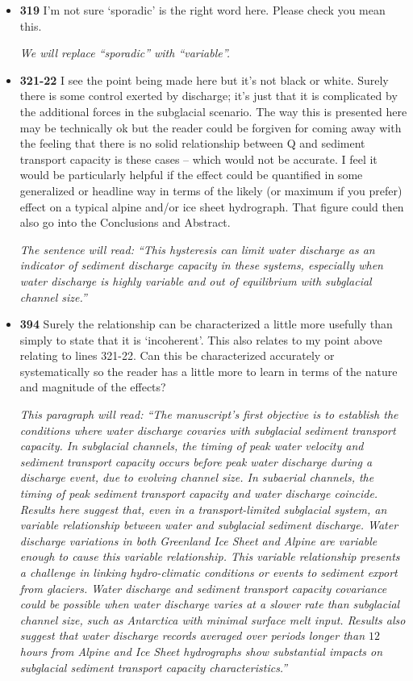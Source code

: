 \documentclass[11pt]{article}
\begin{document}
\begin{itemize}
\item \textbf{319} I’m not sure ‘sporadic’ is the right word here. Please check you mean this.

  \textit{We will replace ``sporadic'' with ``variable''.}
  

  
\item \textbf{321-22} I see the point being made here but it’s not black or white. Surely there is
  some control exerted by discharge; it’s just that it is complicated by the
  additional forces in the subglacial scenario. The way this is presented here
  may be technically ok but the reader could be forgiven for coming away
  with the feeling that there is no solid relationship between Q and sediment
  transport capacity is these cases – which would not be accurate. I feel it
  would be particularly helpful if the effect could be quantified in some
  generalized or headline way in terms of the likely (or maximum if you
  prefer) effect on a typical alpine and/or ice sheet hydrograph. That figure
  could then also go into the Conclusions and Abstract.

  \textit{The sentence will read: ``This hysteresis can limit water discharge as an indicator of sediment discharge capacity in these systems, especially when water discharge is highly variable and out of equilibrium with subglacial channel size.''}

\item \textbf{394} Surely the relationship can be characterized a little more usefully than
  simply to state that it is ‘incoherent’. This also relates to my point above
  relating to lines 321-22. Can this be characterized accurately or
  systematically so the reader has a little more to learn in terms of the nature
  and magnitude of the effects?

\textit{This paragraph will read: ``The manuscript's first objective is to establish the conditions where water discharge covaries with subglacial sediment transport capacity.
In subglacial channels, the timing of peak water velocity and sediment transport capacity occurs before peak water discharge during a discharge event, due to evolving channel size.
In subaerial channels, the timing of peak sediment transport capacity and water discharge coincide.
Results here suggest that, even in a transport-limited subglacial system, an variable relationship between water and subglacial sediment discharge.
Water discharge variations in both Greenland Ice Sheet and Alpine are variable enough to cause this variable relationship.
This variable relationship presents a challenge in linking hydro-climatic conditions or events to sediment export from glaciers.
Water discharge and sediment transport capacity covariance could be possible when water discharge varies at a slower rate than subglacial channel size, such as Antarctica with minimal surface melt input.
Results also suggest that water discharge records averaged over periods longer than $12$ hours from Alpine and Ice Sheet hydrographs show substantial impacts on subglacial sediment transport capacity characteristics.''}


\end{itemize}
\end{document}
